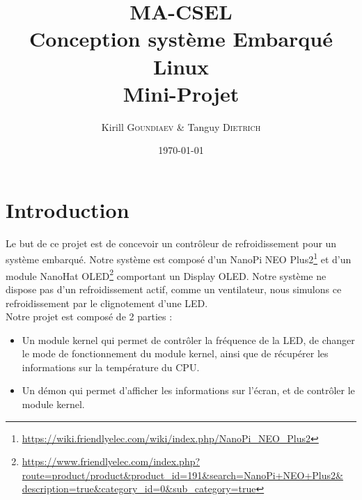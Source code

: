 \documentclass[
	a4paper, %
	10pt, %
]{CSUniSchoolLabReport}
\title{MA-CSEL \\ Conception système Embarqué Linux \\ Mini-Projet } %
\author{Kirill \textsc{Goundiaev} \& Tanguy \textsc{Dietrich}} %
\date{\today} %
\begin{document}
\maketitle %

\begin{figure}[H] %
\label{fig:speciation}
\end{figure}

\begin{figure}[H] %
	\label{fig:speciation}
\end{figure}


\newpage

\tableofcontents
\newpage

\section{Introduction}\label{Introduction}
Le but de ce projet est de concevoir un contrôleur de refroidissement pour un système embarqué. Notre système est composé d'un NanoPi NEO Plus2\footnote{\href{https://wiki.friendlyelec.com/wiki/index.php/NanoPi_NEO_Plus2}{https://wiki.friendlyelec.com/wiki/index.php/NanoPi\_NEO\_Plus2}} et d'un module NanoHat OLED\footnote{\href{https://www.friendlyelec.com/index.php?route=product/product&product_id=191&search=NanoPi+NEO+Plus2&description=true&category_id=0&sub_category=true}{https://www.friendlyelec.com/index.php?route=product/product\&product\_id=191\&search=NanoPi+NEO+Plus2\&\\description=true\&category\_id=0\&sub\_category=true}} comportant un Display OLED. Notre système ne dispose pas d'un refroidissement actif, comme un ventilateur, nous simulons ce refroidissement par le clignotement d'une LED.\\

Notre projet est composé de 2 parties : \\
\begin{itemize}
	\item Un module kernel qui permet de contrôler la fréquence de la LED, de changer le mode de fonctionnement du module kernel, ainsi que de récupérer les informations sur la température du CPU.
	\item Un démon qui permet d'afficher les informations sur l'écran, et de contrôler le module kernel.
\end{itemize}
\end{document}
